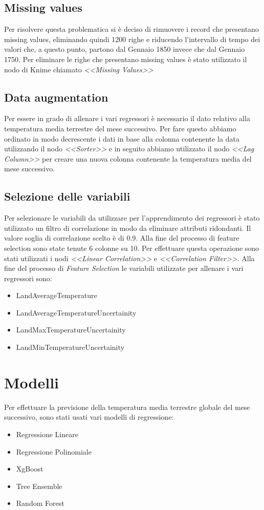 \documentclass[12pt, a4paper, twocolumn]{article} %
\begin{document}
\subsection{Missing values}
Per risolvere questa problematica si è deciso di rimuovere i record che presentano missing values, eliminando quindi 1200 righe e riducendo l'intervallo di tempo dei valori che, a questo punto, partono dal Gennaio 1850 invece che dal Gennaio 1750. Per eliminare le righe che presentano missing values è stato utilizzato il nodo di Knime chiamato \textit{<<Missing Values>>}

\subsection{Data augmentation}
Per essere in grado di allenare i vari regressori è necessario il dato relativo alla temperatura media terrestre del mese successivo. Per fare questo abbiamo ordinato in modo decrescente i dati in base alla colonna contenente la data utilizzando il nodo \textit{<<Sorter>>} e in seguito abbiamo utilizzato il nodo \textit{<<Lag Column>>} per creare una nuova colonna contenente la temperatura media del mese successivo.


\subsection{Selezione delle variabili}
Per selezionare le variabili da utilizzare per l'apprendimento dei regressori è stato utilizzato un filtro di correlazione in modo da eliminare attributi ridondanti. Il valore soglia di correlazione scelto è di 0.9. Alla fine del processo di feature selection sono state tenute 6 colonne su 10. Per effettuare questa operazione sono stati utilizzati i nodi \textit{<<Linear Correlation>>} e \textit{<<Correlation Filter>>}. Alla fine del processo di \textit{Feature Selection} le variabili utilizzate per allenare i vari regressori sono: 
\begin{itemize}
	\item LandAverageTemperature
	\item LandAverageTemperatureUncertainity
	\item LandMaxTemperatureUncertainity
	\item LandMinTemperatureUncertainity
\end{itemize}
\section{Modelli}
Per effettuare la previsione della temperatura media terrestre globale del mese successivo, sono stati usati vari modelli di regressione:
\begin{itemize}
	\item Regressione Lineare
	\item Regressione Polinomiale
	\item XgBoost
	\item Tree Ensemble
	\item Random Forest
\end{itemize}
\end{document}

